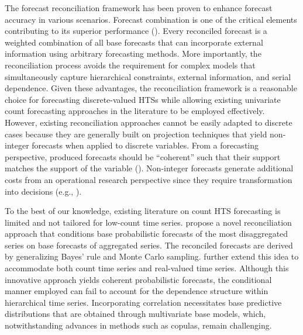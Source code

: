 \documentclass[a4paper,review,12pt,authoryear]{elsarticle}
\theoremstyle{definition}
\begin{document}
The forecast reconciliation framework has been proven to enhance forecast accuracy in various scenarios.
Forecast combination is one of the critical elements contributing to its superior performance (\citealp{hollymanUnderstandingForecastReconciliation2021}).
Every reconciled forecast is a weighted combination of all base forecasts that
can incorporate external information using arbitrary forecasting methods.
More importantly, the reconciliation process avoids the requirement for complex models that simultaneously capture hierarchical constraints, external information, and serial dependence.
Given these advantages, the reconciliation framework is a reasonable choice for forecasting discrete-valued HTSs while allowing existing univariate count forecasting approaches in the literature to be employed effectively.
However, existing reconciliation approaches cannot be easily adapted to discrete cases because they are generally built on projection techniques that yield non-integer forecasts when applied to discrete variables.
From a forecasting perspective, produced forecasts should be ``coherent'' such that their support matches the support of the variable (\citealp{freelandForecastingDiscreteValued2004}).
Non-integer forecasts generate additional costs from an operational research perspective since they require transformation into decisions (e.g., \citealp{goltsosInventoryForecastingMind2022}).

To the best of our knowledge, existing literature on count HTS forecasting is limited and not tailored for low-count time series.
\cite{coraniProbabilisticReconciliationCount2022} propose a novel reconciliation approach that conditions base probabilistic forecasts of the most disaggregated series on base forecasts of aggregated series.
The reconciled forecasts are derived by generalizing Bayes’ rule and Monte Carlo sampling.
\cite{zambonEfficientProbabilisticReconciliation2022} further extend this idea to accommodate both count time series and real-valued time series.
Although this innovative approach yields coherent probabilistic forecasts,
the conditional manner employed can fail to account for the dependence structure within hierarchical time series.
Incorporating correlation necessitates base predictive distributions that are obtained through multivariate base models, which, notwithstanding advances in methods such as copulas, remain challenging.
\end{document}
